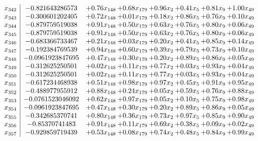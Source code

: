 \documentclass[8pt]{article}
\begin{document}
\[\begin{array}{c| c c@{\hskip 2pt} c@{\hskip 2pt} c@{\hskip 2pt} c@{\hskip 2pt} c@{\hskip 2pt} c@{\hskip 2pt} }
 x_{342}   &  -0.821643286573 & +  0.76 x_{148} & +  0.68 x_{179} & +  0.96 x_{2} & +  0.41 x_{5} & +  0.81 x_{9} & +  1.00 x_{49}\\
 x_{343}   &  -0.300601202405 & +  0.72 x_{148} & +  0.01 x_{179} & +  0.18 x_{2} & +  0.86 x_{5} & +  0.76 x_{9} & +  0.10 x_{49}\\
 x_{344}   &  -0.879759519038 & +  0.91 x_{148} & +  0.50 x_{179} & +  0.63 x_{2} & +  0.76 x_{5} & +  0.80 x_{9} & +  0.06 x_{49}\\
 x_{345}   &  -0.879759519038 & +  0.91 x_{148} & +  0.50 x_{179} & +  0.63 x_{2} & +  0.76 x_{5} & +  0.80 x_{9} & +  0.06 x_{49}\\
 x_{346}   &  -0.683366733467 & +  0.21 x_{148} & +  0.03 x_{179} & +  0.20 x_{2} & +  0.41 x_{5} & +  0.85 x_{9} & +  0.14 x_{49}\\
 x_{347}   &  -0.192384769539 & +  0.94 x_{148} & +  0.60 x_{179} & +  0.39 x_{2} & +  0.79 x_{5} & +  0.73 x_{9} & +  0.10 x_{49}\\
 x_{348}   &  -0.0961923847695 & +  0.47 x_{148} & +  0.30 x_{179} & +  0.20 x_{2} & +  0.89 x_{5} & +  0.86 x_{9} & +  0.05 x_{49}\\
 x_{349}   &  -0.312625250501 & +  0.02 x_{148} & +  0.11 x_{179} & +  0.77 x_{2} & +  0.03 x_{5} & +  0.93 x_{9} & +  0.04 x_{49}\\
 x_{350}   &  -0.312625250501 & +  0.02 x_{148} & +  0.11 x_{179} & +  0.77 x_{2} & +  0.03 x_{5} & +  0.93 x_{9} & +  0.04 x_{49}\\
 x_{351}   &  -0.617234468938 & +  0.51 x_{148} & +  0.98 x_{179} & +  0.97 x_{2} & +  0.45 x_{5} & +  0.91 x_{9} & +  0.95 x_{49}\\
 x_{352}   &  -0.488977955912 & +  0.88 x_{148} & +  0.24 x_{179} & +  0.05 x_{2} & +  0.59 x_{5} & +  0.76 x_{9} & +  0.88 x_{49}\\
 x_{353}   &  -0.0761523046092 & +  0.62 x_{148} & +  0.97 x_{179} & +  0.05 x_{2} & +  0.10 x_{5} & +  0.75 x_{9} & +  0.98 x_{49}\\
 x_{354}   &  -0.0961923847695 & +  0.47 x_{148} & +  0.30 x_{179} & +  0.20 x_{2} & +  0.89 x_{5} & +  0.86 x_{9} & +  0.05 x_{49}\\
 x_{355}   &  -0.342685370741 & +  0.80 x_{148} & +  0.36 x_{179} & +  0.73 x_{2} & +  0.97 x_{5} & +  0.85 x_{9} & +  0.90 x_{49}\\
 x_{356}   &  -0.85370741483 & +  0.91 x_{148} & +  0.11 x_{179} & +  0.69 x_{2} & +  0.38 x_{5} & +  0.09 x_{9} & +  0.02 x_{49}\\
 x_{357}   &  -0.929859719439 & +  0.53 x_{148} & +  0.08 x_{179} & +  0.74 x_{2} & +  0.48 x_{5} & +  0.84 x_{9} & +  0.99 x_{49}\\

\end{array}\]
\end{document}
